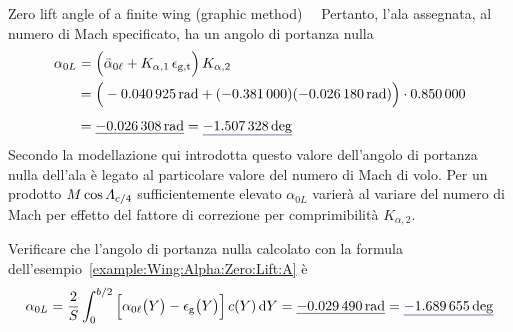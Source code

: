 \documentclass[[12pt,twoside]{book}
\begin{document}
\begin{myExampleX}{Zero lift angle of a finite wing (graphic method)}{\ \myIconGraph\ }
Pertanto, l'ala assegnata, al numero di Mach specificato, ha un angolo di portanza nulla
\[
\begin{split}
\label{eq:Wing:Alpha:Zero:Lift:Roskam:Datcom}
\alpha_{0L} 
  & {}=
    \Big(
      \bar{\alpha}_{0\ell} + K_{\alpha,1} \, \epsilon_{\mathrm{g,t}}
    \Big) \, K_{\alpha,2}
\\
  & {}= 
    \Big(
      \SI[round-precision=4]{\myAlphaZeroLiftMeanWingRAD}{\radian}
        + ( \SI[round-precision=3]{\myDeltaAlphaZeroLiftOverTwistWing}{} )
          ( \SI[round-precision=4]{\myTwistWingRAD}{\radian} )
    \Big)
      \cdot \SI[round-precision=2]{\myPrandtlGlauertCorrectionAlphaZeroLiftWing}{}
\\[4pt]
  & {}= \mathunderline{mydarkblue}{ \SI[round-precision=4]{\myAlphaZeroLiftDatcomWingRAD}{\radian} }
  = \mathunderline{mydarkblue}{ \SI[round-precision=2]{\myAlphaZeroLiftDatcomWingDEG}{\deg} }
\end{split}
\]
Secondo la modellazione qui introdotta
questo valore dell'angolo di portanza nulla dell'ala è legato al particolare valore del numero di 
Mach di volo. Per un prodotto $M \cos\Lambda_{c/4}$ sufficientemente elevato
$\alpha_{0L}$ varierà al variare del numero di Mach per effetto del fattore di correzione per 
comprimibilità $K_{\alpha,2}$.

Verificare che l'angolo di portanza nulla calcolato con la formula 
dell'esempio~\ref{example:Wing:Alpha:Zero:Lift:A}
è
\[
\alpha_{0L} 
  = \frac{2}{S} \int_0^{b/2} 
    \Big[ 
      \alpha_{0\ell}\big(Y\big) - \epsilon_\mathrm{g}\big(Y\big) 
    \Big] \, c(Y) \diff{Y}
  = \mathunderline{mydarkblue}{ \SI[round-precision=4]{\myAlphaZeroLiftWingRAD}{\radian} }
  = \mathunderline{mydarkblue}{ \SI[round-precision=2]{\myAlphaZeroLiftWingDEG}{\deg} }
\]
\end{myExampleX}
\end{document}
